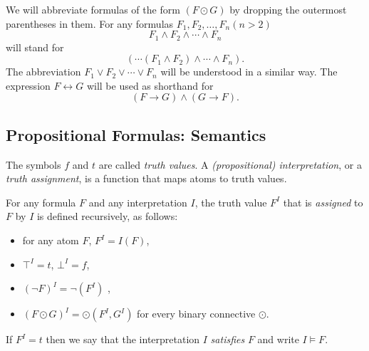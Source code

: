 We will abbreviate formulas of the form $(F \odot G)$ by dropping the outermost parentheses in them. For any formulas $F_1, F_2, \ldots, F_n (n > 2)$
\begin{equation*}
F_1 \wedge F_2 \wedge \cdots \wedge F_n
\end{equation*}
will stand for 
\begin{equation*}
( \cdots (F_1 \wedge F_2) \wedge \cdots \wedge F_n). 
\end{equation*}
The abbreviation $F_1 \vee F_2 \vee \cdots \vee F_n$ will be understood in a similar way. The expression $F \leftrightarrow G$ will be used as shorthand for 
\begin{equation*}
(F \rightarrow G) \wedge ( G \rightarrow F).
\end{equation*}



\subsection{Propositional Formulas: Semantics}
The symbols $f$ and $t$ are called \textit{truth values}. A \textit{(propositional) interpretation}, or a \textit{truth assignment}, is a function that maps atoms to truth values. 

For any formula $F$ and any interpretation $I$, the truth value $F^I$ that is \textit{assigned} to $F$ by $I$ is defined recursively, as follows:
\begin{itemize}
\item for any atom $F$, $F^I = I(F)$,  
\item $\top^I = t$, $\bot^I = f$, 
\item $(\neg F)^I = \neg (F^I)$ , 
\item $(F \odot G)^I = \odot(F^I, G^I)$ for every binary connective $\odot$.  
\end{itemize}
If $F^I = t$ then we say that the interpretation $I$ \textit{satisfies} $F$ and write $I \models F$. 

